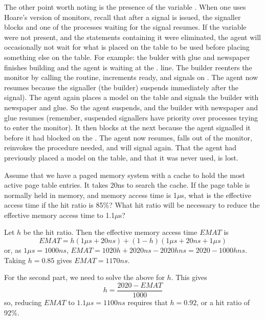 \documentclass[ecs150,spring2022]{ucdclass3}
\begin{document}
\begin{enumerate}[start=4]
\begin{ansenv}
The other point worth noting is the presence of the variable .  When one uses Hoare's version of monitors, recall that after a signal is issued, the signaller blocks and one of the processes waiting for the signal resumes.  If the variable  were not present, and the  statements containing it were eliminated, the agent will occasionally not wait for what is placed on the table to be used before placing something else on the table.  For example: the bulder with glue and newspaper finishes building and the agent is waiting at the . line.  The builder reenters the monitor by calling the  routine, increments ready, and signals on .  The agent now resumes because the signaller (the builder) suspends immediately after the signal).  The agent again places a model on the table and signals the builder with newspaper and glue.  So the agent suspends, and the builder with newspaper and glue resumes (remember, suspended signallers have priority over processes trying to enter the monitor).  It then blocks at the next  because the agent signalled it before it had blocked on the .  The agent now resumes, falls out of the monitor, reinvokes the procedure needed, and will signal again.  That the agent had previously placed a model on the table, and that it was never used, is lost.

\end{ansenv}

\newpage

  Assume that we have a paged memory system with a cache to hold the most active page table entries.  It takes 20ns to search the cache.  If the page table is normally held in memory, and memory access time is 1$\mu$s, what is the effective access time if the hit ratio is 85\%?  What hit ratio will be necessary to reduce the effective memory access time to 1.1$\mu$s?

\begin{ansenv}
Let $h$ be the hit ratio.  Then the effective memory access time $EMAT$ is
$$ EMAT = h (1\mu s + 20ns) + (1 - h)(1\mu s + 20ns + 1\mu s)$$
or, as $1\mu s = 1000ns$, $ EMAT = 1020h + 2020ns - 2020hns = 2020 - 1000h ns$. Taking $h = 0.85$ gives $EMAT = 1170 ns$.

For the second part, we need to solve the above for $h$. This gives
$$h = \frac{2020 - EMAT}{1000}$$ 
so, reducing $EMAT$ to $1.1\mu s = 1100ns$ requires that $h = 0.92$, or a hit ratio of 92\%.
\end{ansenv}


\end{enumerate}
\end{document}
